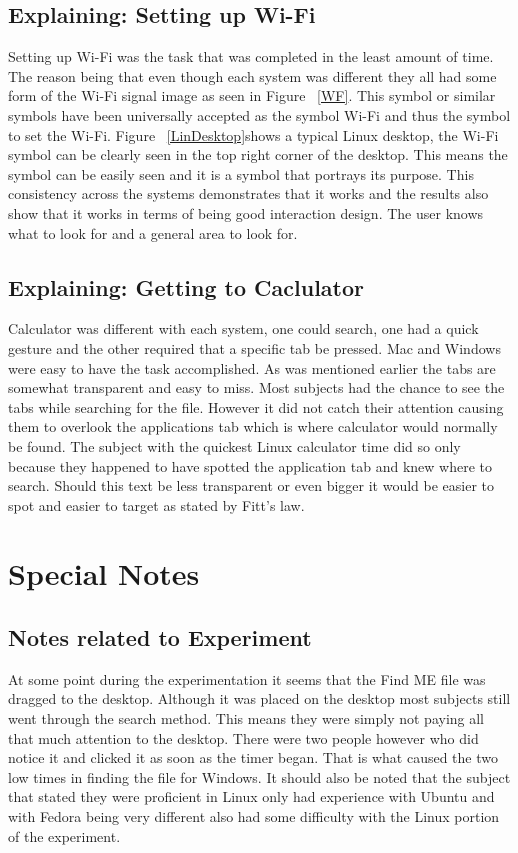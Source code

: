 \documentclass[11pt]{article}
\begin{document}
\subsection{Explaining: Setting up Wi-Fi}
Setting up Wi-Fi was the task that was completed in the least amount of time. The reason being that even though each system was different they all had some form of the Wi-Fi signal image as seen in Figure 	~\ref{WF}. This symbol or similar symbols have been universally accepted as the symbol Wi-Fi and thus the symbol to set the Wi-Fi. Figure ~\ref{LinDesktop}shows a typical Linux desktop, the Wi-Fi symbol can be clearly seen in the top right corner of the desktop. This means the symbol can be easily seen and it is a symbol that portrays its purpose. This consistency across the systems demonstrates that it works and the results also show that it works in terms of being good interaction design. The user knows what to look for and a general area to look for.

\subsection{Explaining: Getting to Caclulator}
Calculator was different with each system, one could search, one had a quick gesture and the other required that a specific tab be pressed. Mac and Windows were easy to have the task accomplished. As was mentioned earlier the tabs are somewhat transparent and easy to miss. Most subjects had the chance to see the tabs while searching for the file. However it did not catch their attention causing them to overlook the applications tab which is where calculator would normally be found. The subject with the quickest Linux calculator time did so only because they happened to have spotted the application tab and knew where to search. Should this text be less transparent or even bigger it would be easier to spot and easier to target as stated by Fitt’s law.

\section{Special Notes}
\subsection{Notes related to Experiment}
At some point during the experimentation it seems that the Find ME file was dragged to the desktop. Although it was placed on the desktop most subjects still went through the search method. This means they were simply not paying all that much attention to the desktop. There were two people however who did notice it and clicked it as soon as the timer began. That is what caused the two low times in finding the file for Windows. It should also be noted that the subject that stated they were proficient in Linux only had experience with Ubuntu and with Fedora being very different also had some difficulty with the Linux portion of the experiment.
\end{document}
